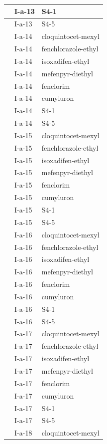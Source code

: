 \documentclass[11pt,a4paper]{article}
\begin{document}
\begin{table}[h]
\begin{tabular}{|l|l|l|}
 & I-a-13 & S4-1 \\ \hline
 & I-a-13 & S4-5 \\ \hline
 & I-a-14 & cloquintocet-mexyl \\ \hline
 & I-a-14 & fenchlorazole-ethyl \\ \hline
 & I-a-14 & isoxadifen-ethyl \\ \hline
 & I-a-14 & mefenpyr-diethyl \\ \hline
 & I-a-14 & fenclorim \\ \hline
 & I-a-14 & cumyluron \\ \hline
 & I-a-14 & S4-1 \\ \hline
 & I-a-14 & S4-5 \\ \hline
 & I-a-15 & cloquintocet-mexyl \\ \hline
 & I-a-15 & fenchlorazole-ethyl \\ \hline
 & I-a-15 & isoxadifen-ethyl \\ \hline
 & I-a-15 & mefenpyr-diethyl \\ \hline
 & I-a-15 & fenclorim \\ \hline
 & I-a-15 & cumyluron \\ \hline
 & I-a-15 & S4-1 \\ \hline
 & I-a-15 & S4-5 \\ \hline
 & I-a-16 & cloquintocet-mexyl \\ \hline
 & I-a-16 & fenchlorazole-ethyl \\ \hline
 & I-a-16 & isoxadifen-ethyl \\ \hline
 & I-a-16 & mefenpyr-diethyl \\ \hline
 & I-a-16 & fenclorim \\ \hline
 & I-a-16 & cumyluron \\ \hline
 & I-a-16 & S4-1 \\ \hline
 & I-a-16 & S4-5 \\ \hline
 & I-a-17 & cloquintocet-mexyl \\ \hline
 & I-a-17 & fenchlorazole-ethyl \\ \hline
 & I-a-17 & isoxadifen-ethyl \\ \hline
 & I-a-17 & mefenpyr-diethyl \\ \hline
 & I-a-17 & fenclorim \\ \hline
 & I-a-17 & cumyluron \\ \hline
 & I-a-17 & S4-1 \\ \hline
 & I-a-17 & S4-5 \\ \hline
 & I-a-18 & cloquintocet-mexyl \\ \hline

\end{tabular}
\end{table}
\end{document}
